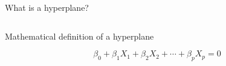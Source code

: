 \documentclass[aspectratio=169,usenames,dvipsnames]{beamer}
\newcommand{\InstructorList}[1]{
\begin{itemize}
	\color{orange}
	#1
\end{itemize}
}
\renewcommand{\InstructorList}[1]{}
\begin{document}
\begin{frame}[t]{What is a hyperplane?}

\begin{columns}
\centering
\InstructorList{
  \item In $p$-dimensional space, a hyperplane is a flat affine subspace of dimension $p-1$
  \item affine means it doesn't have to pass through the origin
	\item Draw example for $p=1,2,3$
}


\centering

\end{columns}

\end{frame}
\begin{frame}[t]{Mathematical definition of a hyperplane}

	\begin{equation*}
		\beta_0 + \beta_1X_1 + \beta_2X_2 + \cdots + \beta_p X_p = 0
	\end{equation*}

\begin{columns}
\centering
\InstructorList{
  \item Being on the hyper plane means having a point $X=(X_1,X_2,\cdots,X_p)^T$ satisfying this
	\item Show that when $p=2$, this is just a line
}

\centering

\end{columns}

\end{frame}
\end{document}
